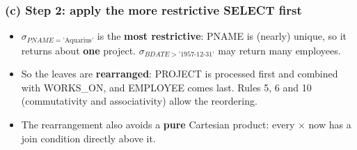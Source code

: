 \documentclass[10pt,a4paper]{article}
\newcommand{\aq}{\text{'Aquarius'}}
\newcommand{\bd}{\text{'1957-12-31'}}
\begin{document}
\subsubsection*{(c) Step 2: apply the more restrictive SELECT first}
\begin{minipage}[c]{0.5\linewidth}\centering
{}
\end{minipage}\hfill
\begin{minipage}[c]{0.46\linewidth}
\begin{itemize}
  \item $\sigma_{PNAME=\aq}$ is the \textbf{most restrictive}: PNAME is (nearly) unique, so it returns about \textbf{one} project. $\sigma_{BDATE>\bd}$ may return many employees.
  \item So the leaves are \textbf{rearranged}: PROJECT is processed first and combined with WORKS\_ON, and EMPLOYEE comes last. Rules 5, 6 and 10 (commutativity and associativity) allow the reordering.
  \item The rearrangement also avoids a \textbf{pure} Cartesian product: every $\times$ now has a join condition directly above it.
\end{itemize}
\end{minipage}
\end{document}
